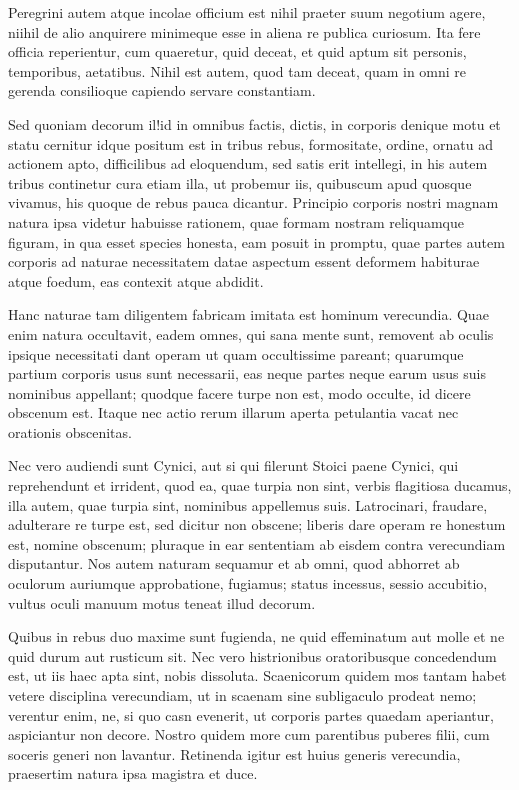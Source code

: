  Peregrini autem atque incolae officium est nihil praeter suum negotium agere, niihil de alio anquirere minimeque esse in aliena re publica curiosum. Ita fere officia reperientur, cum quaeretur, quid deceat, et quid aptum sit personis, temporibus, aetatibus. Nihil est autem, quod tam deceat, quam in omni re gerenda consilioque capiendo servare constantiam.

 Sed quoniam decorum il!id in omnibus factis, dictis, in corporis denique motu et statu cernitur idque positum est in tribus rebus, formositate, ordine, ornatu ad actionem apto, difficilibus ad eloquendum, sed satis erit intellegi, in his autem tribus continetur cura etiam illa, ut probemur iis, quibuscum apud quosque vivamus, his quoque de rebus pauca dicantur. Principio corporis nostri magnam natura ipsa videtur habuisse rationem, quae formam nostram reliquamque figuram, in qua esset species honesta, eam posuit in promptu, quae partes autem corporis ad naturae necessitatem datae aspectum essent deformem habiturae atque foedum, eas contexit atque abdidit.

 Hanc naturae tam diligentem fabricam imitata est hominum verecundia. Quae enim natura occultavit, eadem omnes, qui sana mente sunt, removent ab oculis ipsique necessitati dant operam ut quam occultissime pareant; quarumque partium corporis usus sunt necessarii, eas neque partes neque earum usus suis nominibus appellant; quodque facere turpe non est, modo occulte, id dicere obscenum est. Itaque nec actio rerum illarum aperta petulantia vacat nec orationis obscenitas.

 Nec vero audiendi sunt Cynici, aut si qui filerunt Stoici paene Cynici, qui reprehendunt et irrident, quod ea, quae turpia non sint, verbis flagitiosa ducamus, illa autem, quae turpia sint, nominibus appellemus suis. Latrocinari, fraudare, adulterare re turpe est, sed dicitur non obscene; liberis dare operam re honestum est, nomine obscenum; pluraque in ear sententiam ab eisdem contra verecundiam disputantur. Nos autem naturam sequamur et ab omni, quod abhorret ab oculorum auriumque approbatione, fugiamus; status incessus, sessio accubitio, vultus oculi manuum motus teneat illud decorum.

 Quibus in rebus duo maxime sunt fugienda, ne quid effeminatum aut molle et ne quid durum aut rusticum sit. Nec vero histrionibus oratoribusque concedendum est, ut iis haec apta sint, nobis dissoluta. Scaenicorum quidem mos tantam habet vetere disciplina verecundiam, ut in scaenam sine subligaculo prodeat nemo; verentur enim, ne, si quo casn evenerit, ut corporis partes quaedam aperiantur, aspiciantur non decore. Nostro quidem more cum parentibus puberes filii, cum soceris generi non lavantur. Retinenda igitur est huius generis verecundia, praesertim natura ipsa magistra et duce.


